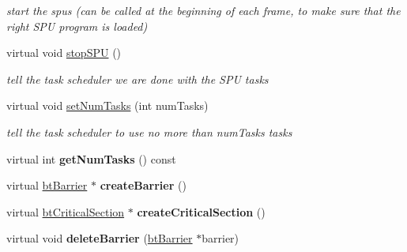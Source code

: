 \begin{DoxyCompactItemize}
\begin{DoxyCompactList}\small\item\em start the spus (can be called at the beginning of each frame, to make sure that the right S\+PU program is loaded) \end{DoxyCompactList}\item 
\mbox{\label{classPosixThreadSupport_a42e31438ebcd31bce0ea15e3c16f5881}} 
virtual void \hyperlink{classPosixThreadSupport_a42e31438ebcd31bce0ea15e3c16f5881}{stop\+S\+PU} ()
\begin{DoxyCompactList}\small\item\em tell the task scheduler we are done with the S\+PU tasks \end{DoxyCompactList}\item 
\mbox{\label{classPosixThreadSupport_a8036f513f0c6f9116b60cafa021a9a1f}} 
virtual void \hyperlink{classPosixThreadSupport_a8036f513f0c6f9116b60cafa021a9a1f}{set\+Num\+Tasks} (int num\+Tasks)
\begin{DoxyCompactList}\small\item\em tell the task scheduler to use no more than num\+Tasks tasks \end{DoxyCompactList}\item 
\mbox{\label{classPosixThreadSupport_a428b91ba73a254683a4056cbac56d265}} 
virtual int {\bfseries get\+Num\+Tasks} () const
\item 
\mbox{\label{classPosixThreadSupport_af7a49d2d846b1240055edc7b314ce30b}} 
virtual \hyperlink{classbtBarrier}{bt\+Barrier} $\ast$ {\bfseries create\+Barrier} ()
\item 
\mbox{\label{classPosixThreadSupport_aec07e6694368496f0e0e723fabc99c36}} 
virtual \hyperlink{classbtCriticalSection}{bt\+Critical\+Section} $\ast$ {\bfseries create\+Critical\+Section} ()
\item 
\mbox{\label{classPosixThreadSupport_a6e9f1aac4898126e0fb597ab07bd4b00}} 
virtual void {\bfseries delete\+Barrier} (\hyperlink{classbtBarrier}{bt\+Barrier} $\ast$barrier)
\item 
\mbox{\label{classPosixThreadSupport_a2732d6edf3349a6c7d8bbbbcf3ba81f5}} 

\end{DoxyCompactItemize}
